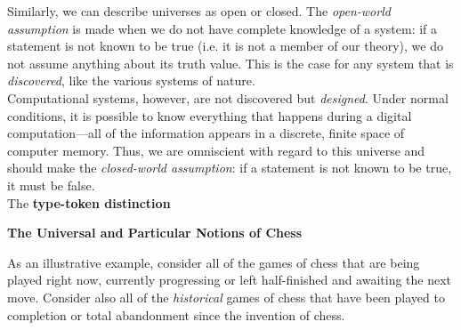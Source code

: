 Similarly, we can describe universes as open or closed. The \textit{open-world assumption} is made when we do not have complete knowledge of a system: if a statement is not known to be true (i.e. it is not a member of our theory), we do not assume anything about its truth value. This is the case for any system that is \textit{discovered}, like the various systems of nature. \\

Computational systems, however, are not discovered but \textit{designed}. Under normal conditions, it is possible to know everything that happens during a digital computation---all of the information appears in a discrete, finite space of computer memory. Thus, we are omniscient with regard to this universe and should make the \textit{closed-world assumption}: if a statement is not known to be true, it must be false. \\


The \textbf{type-token distinction} \\


\begin{tcolorbox}[breakable, enhanced, colback=textbook-blue, sharp corners]
	\vspace{3mm}
	\begin{center}
		\textbf{The Universal and Particular Notions of Chess}
	\end{center}
	
	
	As an illustrative example, consider all of the games of chess that are being played right now, currently progressing or left half-finished and awaiting the next move. Consider also all of the \textit{historical} games of chess that have been played to completion or total abandonment since the invention of chess.
	\vspace{3mm}
\end{tcolorbox}
\vspace{2\baselineskip}

